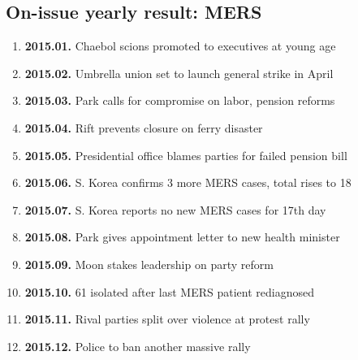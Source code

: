 \subsection{On-issue yearly result: MERS}
\begin{enumerate}
  \item \textbf{2015.01.} Chaebol scions promoted to executives at young age
  \item \textbf{2015.02.} Umbrella union set to launch general strike in April
  \item \textbf{2015.03.} Park calls for compromise on labor, pension reforms
  \item \textbf{2015.04.} Rift prevents closure on ferry disaster
  \item \textbf{2015.05.} Presidential office blames parties for failed pension bill
  \item \textbf{2015.06.} S. Korea confirms 3 more MERS cases, total rises to 18
  \item \textbf{2015.07.} S. Korea reports no new MERS cases for 17th day
  \item \textbf{2015.08.} Park gives appointment letter to new health minister
  \item \textbf{2015.09.} Moon stakes leadership on party reform
  \item \textbf{2015.10.} 61 isolated after last MERS patient rediagnosed
  \item \textbf{2015.11.} Rival parties split over violence at protest rally
  \item \textbf{2015.12.} Police to ban another massive rally
\end{enumerate}

